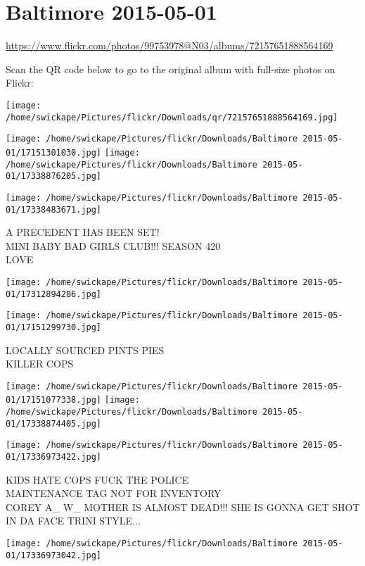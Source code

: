 \documentclass[10pt,letterpaper]{article}
\title{}
\author{}
\date{}
\begin{document}
\section*{Baltimore 2015-05-01}

\url{https://www.flickr.com/photos/99753978@N03/albums/72157651888564169}

Scan the QR code below to go to the original album with full-size photos on Flickr:

\texttt{[image: /home/swickape/Pictures/flickr/Downloads/qr/72157651888564169.jpg]}
\pagebreak

\texttt{[image: /home/swickape/Pictures/flickr/Downloads/Baltimore 2015-05-01/17151301030.jpg]}
\texttt{[image: /home/swickape/Pictures/flickr/Downloads/Baltimore 2015-05-01/17338876205.jpg]}

\texttt{[image: /home/swickape/Pictures/flickr/Downloads/Baltimore 2015-05-01/17338483671.jpg]}

A PRECEDENT HAS BEEN SET!\\
MINI BABY BAD GIRLS CLUB!!! SEASON 420\\
LOVE
\pagebreak

\texttt{[image: /home/swickape/Pictures/flickr/Downloads/Baltimore 2015-05-01/17312894286.jpg]}

\vspace{0.25in}
\texttt{[image: /home/swickape/Pictures/flickr/Downloads/Baltimore 2015-05-01/17151299730.jpg]}

LOCALLY SOURCED PINTS PIES\\
KILLER COPS
\pagebreak

\texttt{[image: /home/swickape/Pictures/flickr/Downloads/Baltimore 2015-05-01/17151077338.jpg]}
\texttt{[image: /home/swickape/Pictures/flickr/Downloads/Baltimore 2015-05-01/17338874405.jpg]}

\vspace{0.25in}
\texttt{[image: /home/swickape/Pictures/flickr/Downloads/Baltimore 2015-05-01/17336973422.jpg]}

KIDS HATE COPS FUCK THE POLICE\\
MAINTENANCE TAG NOT FOR INVENTORY\\
COREY A\_ W\_ MOTHER IS ALMOST DEAD!!!  SHE IS GONNA GET SHOT IN DA FACE TRINI STYLE...
\pagebreak

\texttt{[image: /home/swickape/Pictures/flickr/Downloads/Baltimore 2015-05-01/17336973042.jpg]}
\end{document}
